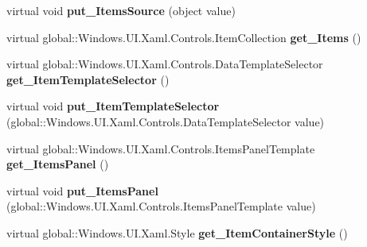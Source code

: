\begin{DoxyCompactItemize}
\mbox{\label{class_windows_1_1_u_i_1_1_xaml_1_1_controls_1_1_items_control_aeea26f9c774f2e66be28cffd70420e8c}} 
virtual void {\bfseries put\+\_\+\+Items\+Source} (object value)
\item 
\mbox{\label{class_windows_1_1_u_i_1_1_xaml_1_1_controls_1_1_items_control_a5f5a8f9fc3aafc90d6f7e7ad33f58698}} 
virtual global\+::\+Windows.\+U\+I.\+Xaml.\+Controls.\+Item\+Collection {\bfseries get\+\_\+\+Items} ()
\item 
\mbox{\label{class_windows_1_1_u_i_1_1_xaml_1_1_controls_1_1_items_control_a9959b8e62f370e00b7c5ba03c1735a6c}} 
virtual global\+::\+Windows.\+U\+I.\+Xaml.\+Controls.\+Data\+Template\+Selector {\bfseries get\+\_\+\+Item\+Template\+Selector} ()
\item 
\mbox{\label{class_windows_1_1_u_i_1_1_xaml_1_1_controls_1_1_items_control_aa9c0c0db76f9d77b78c08b022e500e90}} 
virtual void {\bfseries put\+\_\+\+Item\+Template\+Selector} (global\+::\+Windows.\+U\+I.\+Xaml.\+Controls.\+Data\+Template\+Selector value)
\item 
\mbox{\label{class_windows_1_1_u_i_1_1_xaml_1_1_controls_1_1_items_control_a54332e55a6fbe6987c21c07fe342a9e2}} 
virtual global\+::\+Windows.\+U\+I.\+Xaml.\+Controls.\+Items\+Panel\+Template {\bfseries get\+\_\+\+Items\+Panel} ()
\item 
\mbox{\label{class_windows_1_1_u_i_1_1_xaml_1_1_controls_1_1_items_control_affd7b155eec7e46ac2c935a6634d6d21}} 
virtual void {\bfseries put\+\_\+\+Items\+Panel} (global\+::\+Windows.\+U\+I.\+Xaml.\+Controls.\+Items\+Panel\+Template value)
\item 
\mbox{\label{class_windows_1_1_u_i_1_1_xaml_1_1_controls_1_1_items_control_ac8ecf557d2e90d25785dc40f5d1e3069}} 
virtual global\+::\+Windows.\+U\+I.\+Xaml.\+Style {\bfseries get\+\_\+\+Item\+Container\+Style} ()

\end{DoxyCompactItemize}
